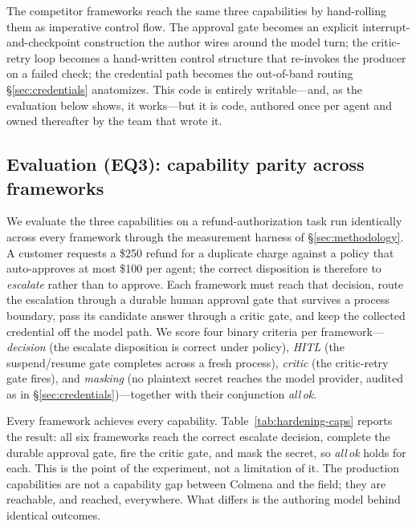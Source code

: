 The competitor frameworks reach the same three capabilities by
hand-rolling them as imperative control flow. The approval gate becomes an
explicit interrupt-and-checkpoint construction the author wires around the
model turn; the critic-retry loop becomes a hand-written control structure
that re-invokes the producer on a failed check; the credential path becomes
the out-of-band routing \S\ref{sec:credentials} anatomizes. This code is
entirely writable---and, as the evaluation below shows, it works---but it is
code, authored once per agent and owned thereafter by the team that wrote it.

\subsection{Evaluation (EQ3): capability parity across frameworks}
\label{subsec:hardening-eval}

We evaluate the three capabilities on a refund-authorization task run
identically across every framework through the measurement harness of
\S\ref{sec:methodology}. A customer requests a \$250 refund for a
duplicate charge against a policy that auto-approves at most \$100
per agent; the correct disposition is therefore to \emph{escalate} rather
than to approve. Each framework must reach that decision, route the
escalation through a durable human approval gate that survives a
process boundary, pass its candidate answer through a critic gate, and
keep the collected credential off the model path. We score four binary
criteria per framework---\emph{decision} (the escalate disposition is
correct under policy), \emph{HITL} (the suspend/resume gate completes
across a fresh process), \emph{critic} (the critic-retry gate fires), and
\emph{masking} (no plaintext secret reaches the model provider, audited as
in \S\ref{sec:credentials})---together with their conjunction
\emph{all\,ok}.

Every framework achieves every capability. Table~\ref{tab:hardening-caps}
reports the result: all six frameworks reach the correct escalate decision,
complete the durable approval gate, fire the critic gate, and mask the
secret, so \emph{all\,ok} holds for each. This is the point of the
experiment, not a limitation of it. The production capabilities are not a
capability gap between Colmena and the field; they are reachable, and
reached, everywhere. What differs is the authoring model behind identical
outcomes.

